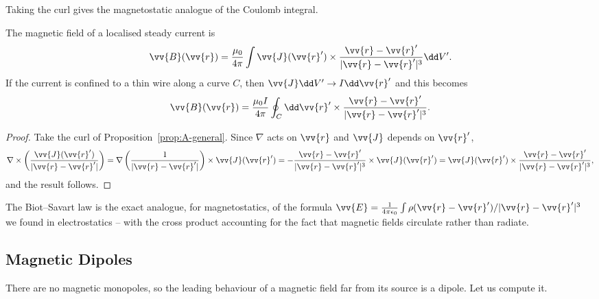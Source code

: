 Taking the curl gives the magnetostatic analogue of the Coulomb integral.

\begin{law}
	The magnetic field of a localised steady current is
	$$
	\vv{B}(\vv{r}) = \frac{\mu_0}{4\pi}\int \vv{J}(\vv{r}')\times \frac{\vv{r}-\vv{r}'}{|\vv{r}-\vv{r}'|^3}\dd V'.
	$$
	If the current is confined to a thin wire along a curve $C$, then $\vv{J}\dd V' \to I \dd \vv{r}'$ and this becomes
	$$
	\vv{B}(\vv{r}) = \frac{\mu_0 I}{4\pi}\oint_C \dd \vv{r}' \times \frac{\vv{r}-\vv{r}'}{|\vv{r}-\vv{r}'|^3}.
	$$
\end{law}
\begin{proof}
	Take the curl of Proposition~\ref{prop:A-general}. Since $\nabla$ acts on $\vv{r}$ and $\vv{J}$ depends on $\vv{r}'$,
	$$
	\nabla\times\left(\frac{\vv{J}(\vv{r}')}{|\vv{r}-\vv{r}'|}\right) = \nabla\left(\frac{1}{|\vv{r}-\vv{r}'|}\right)\times \vv{J}(\vv{r}') = -\frac{\vv{r}-\vv{r}'}{|\vv{r}-\vv{r}'|^3}\times \vv{J}(\vv{r}') = \vv{J}(\vv{r}')\times\frac{\vv{r}-\vv{r}'}{|\vv{r}-\vv{r}'|^3},
	$$
	and the result follows.
\end{proof}

The Biot--Savart law is the exact analogue, for magnetostatics, of the formula $\vv{E} = \frac{1}{4\pi\epsilon_0}\int \rho (\vv{r}-\vv{r}')/|\vv{r}-\vv{r}'|^3$ we found in electrostatics -- with the cross product accounting for the fact that magnetic fields circulate rather than radiate.

\subsection{Magnetic Dipoles}

There are no magnetic monopoles, so the leading behaviour of a magnetic field far from its source is a dipole. Let us compute it.

